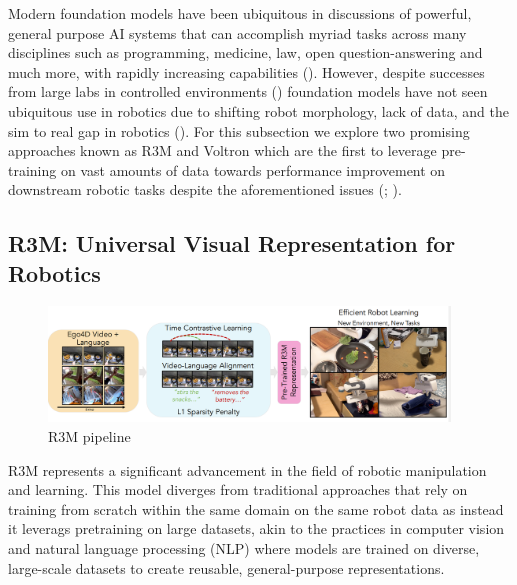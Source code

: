 \documentclass[
  letterpaper,
  DIV=11,
  numbers=noendperiod,
  oneside]{scrreprt}
\theoremstyle{remark}
\begin{document}
Modern foundation models have been ubiquitous in discussions of
powerful, general purpose AI systems that can accomplish myriad tasks
across many disciplines such as programming, medicine, law, open
question-answering and much more, with rapidly increasing capabilities
().
However, despite successes from large labs in controlled environments
() foundation models
have not seen ubiquitous use in robotics due to shifting robot
morphology, lack of data, and the sim to real gap in robotics
(). For this
subsection we explore two promising approaches known as R3M and Voltron
which are the first to leverage pre-training on vast amounts of data
towards performance improvement on downstream robotic tasks despite the
aforementioned issues (;
).

\subsection{R3M: Universal Visual Representation for
Robotics}\label{r3m-universal-visual-representation-for-robotics}

\begin{figure}[H]

{\centering \includegraphics[width=0.95\textwidth,height=\textheight]{Figures/r3m.png}

}

\caption{R3M pipeline}

\end{figure}%

R3M represents a significant advancement in the field of robotic
manipulation and learning. This model diverges from traditional
approaches that rely on training from scratch within the same domain on
the same robot data as instead it leverags pretraining on large
datasets, akin to the practices in computer vision and natural language
processing (NLP) where models are trained on diverse, large-scale
datasets to create reusable, general-purpose representations.
\end{document}
